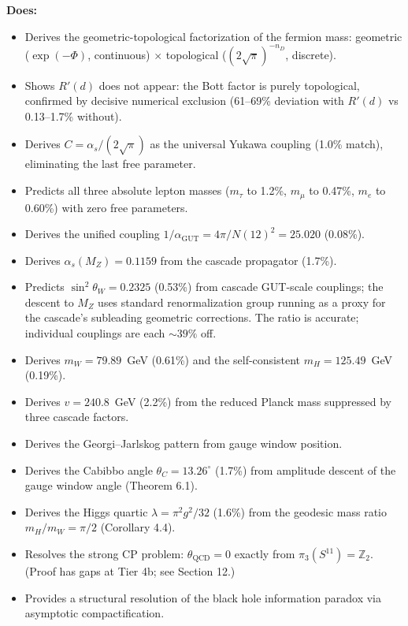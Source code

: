 \documentclass[12pt,a4paper]{article}
\begin{document}
\textbf{Does:}
\begin{itemize}
\item Derives the geometric-topological factorization of the fermion mass: geometric ($\exp(-\Phi)$, continuous) $\times$ topological ($(2\sqrt{\pi})^{-n_D}$, discrete).
\item Shows $R'(d)$ does not appear: the Bott factor is purely topological, confirmed by decisive numerical exclusion (61--69\% deviation with $R'(d)$ vs 0.13--1.7\% without).
\item Derives $C = \alpha_s/(2\sqrt{\pi})$ as the universal Yukawa coupling (1.0\% match), eliminating the last free parameter.
\item Predicts all three absolute lepton masses ($m_\tau$ to 1.2\%, $m_\mu$ to 0.47\%, $m_e$ to 0.60\%) with zero free parameters.
\item Derives the unified coupling $1/\alpha_{\text{GUT}} = 4\pi/N(12)^2 = 25.020$ (0.08\%).
\item Derives $\alpha_s(M_Z) = 0.1159$ from the cascade propagator (1.7\%).
\item Predicts $\sin^2\theta_W = 0.2325$ (0.53\%) from cascade GUT-scale couplings; the descent to $M_Z$ uses standard renormalization group running as a proxy for the cascade's subleading geometric corrections. The ratio is accurate; individual couplings are each $\sim 39\%$ off.
\item Derives $m_W = 79.89$~GeV (0.61\%) and the self-consistent $m_H = 125.49$~GeV (0.19\%).
\item Derives $v = 240.8$~GeV (2.2\%) from the reduced Planck mass suppressed by three cascade factors.
\item Derives the Georgi--Jarlskog pattern from gauge window position.
\item Derives the Cabibbo angle $\theta_C = 13.26^\circ$ (1.7\%) from amplitude descent of the gauge window angle (Theorem 6.1).
\item Derives the Higgs quartic $\lambda = \pi^2 g^2/32$ (1.6\%) from the geodesic mass ratio $m_H/m_W = \pi/2$ (Corollary 4.4).
\item Resolves the strong CP problem: $\theta_{\text{QCD}} = 0$ exactly from $\pi_3(S^{11}) = \mathbb{Z}_2$. (Proof has gaps at Tier 4b; see Section 12.)
\item Provides a structural resolution of the black hole information paradox via asymptotic compactification.
\end{itemize}
\end{document}
